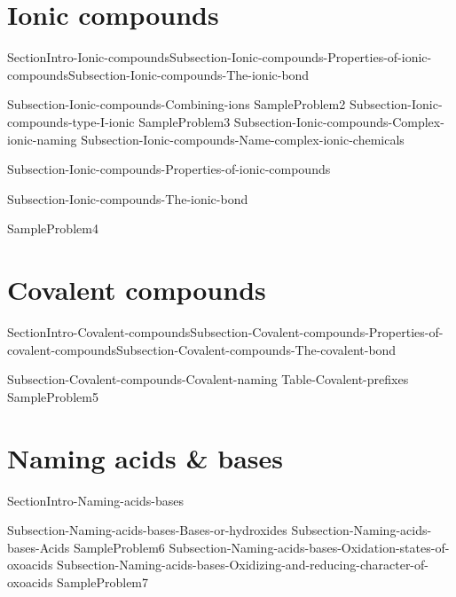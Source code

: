 \documentclass[main.tex]{subfiles}
\newcommand\chapterlabel{Ch-naming}\setcounter{figurenewcounter}{0}\setcounter{tablenewcounter}{0}\setcounter{formulanewcounter}{0}
\begin{document}
\section{Ionic compounds}
{SectionIntro-Ionic-compounds}{Subsection-Ionic-compounds-Properties-of-ionic-compounds}{Subsection-Ionic-compounds-The-ionic-bond}
\sloppy \begin{description}
{Subsection-Ionic-compounds-Combining-ions}
{SampleProblem2}
{Subsection-Ionic-compounds-type-I-ionic}
{SampleProblem3}
{Subsection-Ionic-compounds-Complex-ionic-naming}
{Subsection-Ionic-compounds-Name-complex-ionic-chemicals}


\item[\docfilehook{Properties of ionic compounds}{}]{Subsection-Ionic-compounds-Properties-of-ionic-compounds}
\item[\docfilehook{The ionic bond}{ }]{Subsection-Ionic-compounds-The-ionic-bond}
\end{description}
{SampleProblem4}
\section{Covalent compounds}
{SectionIntro-Covalent-compounds}{Subsection-Covalent-compounds-Properties-of-covalent-compounds}{Subsection-Covalent-compounds-The-covalent-bond}
\sloppy \begin{description}
{Subsection-Covalent-compounds-Covalent-naming}
 {Table-Covalent-prefixes}	
{SampleProblem5}
\end{description}
\section{Naming acids \& bases}
{SectionIntro-Naming-acids-bases}
\sloppy \begin{description}
{Subsection-Naming-acids-bases-Bases-or-hydroxides}
{Subsection-Naming-acids-bases-Acids}
{SampleProblem6}
{Subsection-Naming-acids-bases-Oxidation-states-of-oxoacids}
{Subsection-Naming-acids-bases-Oxidizing-and-reducing-character-of-oxoacids}
{SampleProblem7}
\end{description}
\end{document}
